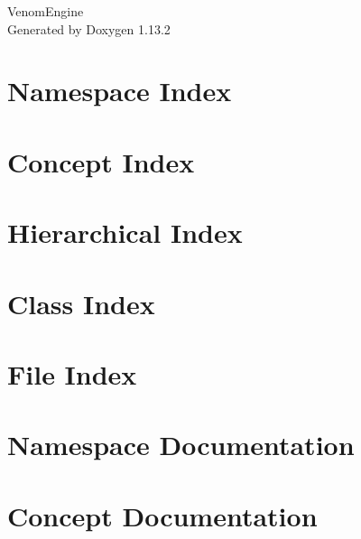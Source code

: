 \documentclass[twoside]{book}
\newcommand{\+}{\discretionary{\mbox{\scriptsize$\hookleftarrow$}}{}{}}
\newcommand{\clearemptydoublepage}{%
    \newpage{\pagestyle{empty}\cleardoublepage}%
  }
\begin{document}
  \raggedbottom
    \hypersetup{pageanchor=false,
                bookmarksnumbered=true,
                pdfencoding=unicode
               }
  \begin{titlepage}
  \vspace*{7cm}
  \begin{center}%
  {\Large Venom\+Engine}\\
  \vspace*{1cm}
  {\large Generated by Doxygen 1.13.2}\\
  \end{center}
  \end{titlepage}
  \clearemptydoublepage
  \tableofcontents
  \clearemptydoublepage
  \hypersetup{pageanchor=true}



\chapter{Namespace Index}

\chapter{Concept Index}

\chapter{Hierarchical Index}

\chapter{Class Index}

\chapter{File Index}

\chapter{Namespace Documentation}



\chapter{Concept Documentation}




\end{document}
